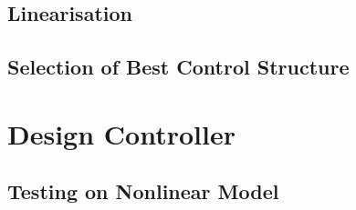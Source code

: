\documentclass[paper=letter, fontsize=12pt]{article}
\begin{document}
\subsection{Linearisation}
\subsection{Selection of Best Control Structure}






\section{Design Controller}
\subsection{Testing on Nonlinear Model}










\end{document}
